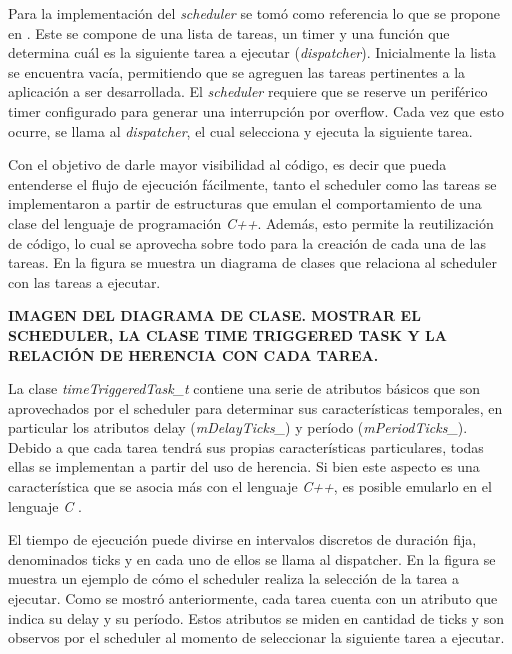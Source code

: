 Para la implementación del \textit{scheduler} se tomó como referencia lo que se propone en \cite{pont2008patterns}. Este se compone de una lista de tareas, un timer y una función que determina cuál es la siguiente tarea a ejecutar (\textit{dispatcher}). Inicialmente la lista se encuentra vacía, permitiendo que se agreguen las tareas pertinentes a la aplicación a ser desarrollada. El \textit{scheduler} requiere que se reserve un periférico timer configurado para generar una interrupción por overflow. Cada vez que esto ocurre, se llama al \textit{dispatcher}, el cual selecciona y ejecuta la siguiente tarea.

Con el objetivo de darle mayor visibilidad al código, es decir que pueda entenderse el flujo de ejecución fácilmente, tanto el scheduler como las tareas se implementaron a partir de estructuras que emulan el comportamiento de una clase del lenguaje de programación \textit{C++}. Además, esto permite la reutilización de código, lo cual se aprovecha sobre todo para la creación de cada una de las tareas. En la figura  se muestra un diagrama de clases que relaciona al scheduler con las tareas a ejecutar. %



{\Large \textbf{{\color{red} IMAGEN DEL DIAGRAMA DE CLASE. MOSTRAR EL SCHEDULER, LA CLASE TIME TRIGGERED TASK Y LA RELACIÓN DE HERENCIA CON CADA TAREA.}}}

La clase \textit{timeTriggeredTask\_t} contiene una serie de atributos básicos que son aprovechados por el scheduler para determinar sus características temporales, en particular los atributos delay (\textit{mDelayTicks\_}) y período (\textit{mPeriodTicks\_}). Debido a que cada tarea tendrá sus propias características particulares, todas ellas se implementan a partir del uso de herencia. Si bien este aspecto es una característica que se asocia más con el lenguaje \textit{C++}, es posible emularlo en el lenguaje \textit{C} \cite[p.~32]{samek2008practical}.

El tiempo de ejecución puede divirse en intervalos discretos de duración fija, denominados ticks y en cada uno de ellos se llama al dispatcher. En la figura  se muestra un ejemplo de cómo el scheduler realiza la selección de la tarea a ejecutar. Como se mostró anteriormente, cada tarea cuenta con un atributo que indica su delay y su período. Estos atributos se miden en cantidad de ticks y son observos por el scheduler al momento de seleccionar la siguiente tarea a ejecutar.

